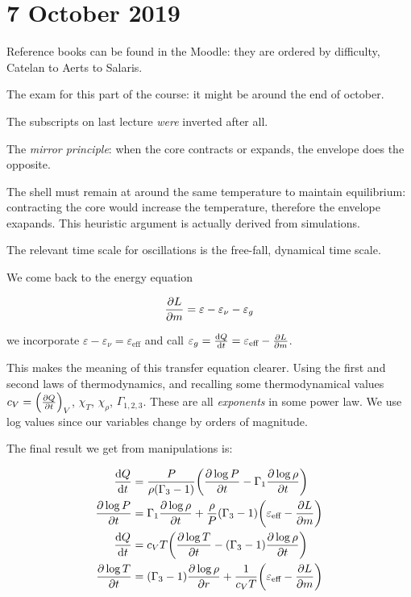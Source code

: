 \documentclass[main.tex]{subfiles}
\begin{document}
\section*{7 October 2019}

Reference books can be found in the Moodle:
they are ordered by difficulty, Catelan to Aerts to Salaris.

The exam for this part of the course: it might be around the end of october.

The subscripts on last lecture \emph{were} inverted after all.

The \emph{mirror principle}: when the core contracts or expands, the envelope does the opposite.

The shell must remain at around the same temperature to maintain equilibrium: contracting the core would increase the temperature, therefore the envelope exapands.
This heuristic argument is actually derived from simulations.

The relevant time scale for oscillations is the free-fall, dynamical time scale.

We come back to the energy equation

\begin{equation}
  \pdv{L}{m} = \varepsilon - \varepsilon_\nu - \varepsilon_g
\end{equation}

we incorporate \(\varepsilon - \varepsilon_\nu = \varepsilon_{\text{eff}} \) and call \( \varepsilon_g = \dv{Q}{t} = \varepsilon_{\text{eff}} - \pdv{L}{m}\).

This makes the meaning of this transfer equation clearer.
Using the first and second laws of thermodynamics, and recalling some thermodynamical values \(c_V = \qty(\pdv{Q}{t})_V \), \(\chi_T \), \(\chi_\rho
\), \(\Gamma_{1,2,3}\).
These are all \emph{exponents} in some power law.
We use log values since our variables change by orders of magnitude.

The final result we get from manipulations is:

\begin{subequations}
\begin{align}
  \dv{Q}{t}  &= \frac{P}{\rho (\Gamma_3 -1)} \qty(\pdv{\log P }{t} - \Gamma_1\pdv{\log \rho}{t}  )  \\
  \pdv{\log P }{t} &= \Gamma_1 \pdv{\log \rho}{t} + \frac{\rho}{P} (\Gamma_3 - 1) \qty(\varepsilon_{\text{eff}} - \pdv{L}{m})  \\
  \dv{Q}{t} &= c_V T \qty(\pdv{\log T}{t} - (\Gamma_3 - 1) \pdv{\log \rho}{t}) \\
  \pdv{\log T }{t} &= (\Gamma_3 - 1) \pdv{\log \rho}{r} + \frac{1}{c_V T} \qty(\varepsilon_{\text{eff}} - \pdv{L}{m})  
\end{align}
\end{subequations}
\end{document}
